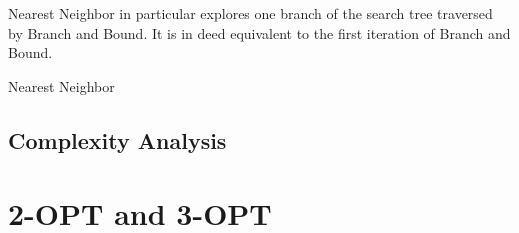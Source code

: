     Nearest Neighbor in particular explores one branch of the search tree traversed by Branch and Bound. It is in deed equivalent to the first iteration of Branch and Bound. 
        \begin{algorithm}
        \caption{Nearest Neighbor}
        \label{algo:nearest-neighbor}
             
    \end{algorithm}

    \subsection{Complexity Analysis}
    
    

    \section{2-OPT and 3-OPT}
